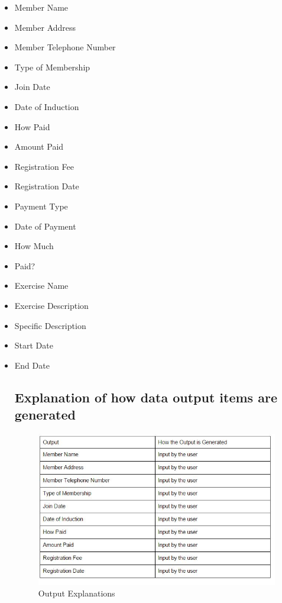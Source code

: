 \begin{itemize}
    \item Member Name
    \item Member Address
    \item Member Telephone Number
    \item Type of Membership
    \item Join Date
    \item Date of Induction
    \item How Paid
    \item Amount Paid
    \item Registration Fee
    \item Registration Date
    \item Payment Type
    \item Date of Payment
    \item How Much
    \item Paid?
    \item Exercise Name
    \item Exercise Description
    \item Specific Description
    \item Start Date
    \item End Date

\subsection{Explanation of how data output items are generated}

\begin{figure}[H]
    \includegraphics[width=\textwidth]{Outputexplanations1.JPG}
    \caption{Output Explanations} \label{fig:Output Explanations}
\end{figure}


\end{itemize}
